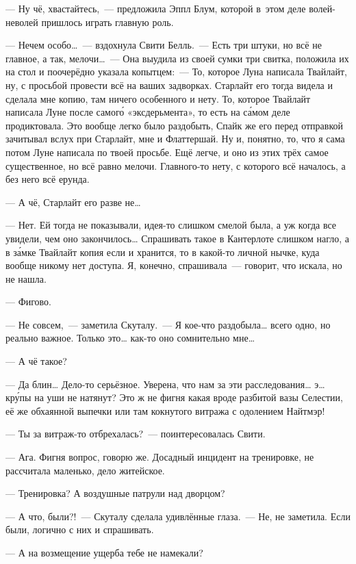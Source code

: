 \documentclass[fontsize=11pt,a5paper,titlepage=firstcover]{scrbook}
\begin{document}
--- Ну чё, хвастайтесь,~--- предложила Эппл Блум, которой в~этом деле волей-неволей пришлось играть главную роль.

--- Нечем особо{\ldots}~--- вздохнула Свити Белль.~--- Есть три штуки, но всё не главное, а так, мелочи{\ldots}~--- Она выудила из своей сумки три свитка, положила их на стол и поочерёдно указала копытцем:~--- То, которое Луна написала Твайлайт, ну, с просьбой провести всё на ваших задворках. Старлайт его тогда видела и сделала мне копию, там ничего особенного и нету. То, которое Твайлайт написала Луне после самого́ «эксдерьмента», то есть на са́мом деле продиктовала. Это вообще легко было раздобыть, Спайк же его перед отправкой зачитывал вслух при Старлайт, мне и Флаттершай. Ну и, понятно, то, что я сама потом Луне написала по твоей просьбе. Ещё легче, и оно из этих трёх самое существенное, но всё равно мелочи. Главного-то нету, с которого всё началось, а без него всё ерунда.

--- А чё, Старлайт его разве не{\ldots}

--- Нет. Ей тогда не показывали, идея-то слишком смелой была, а уж когда все увидели, чем оно закончилось{\ldots} Спрашивать такое в Кантерлоте слишком нагло, а в за́мке Твайлайт копия если и хранится, то в какой-то личной нычке, куда вообще никому нет доступа. Я, конечно, спрашивала~--- говорит, что искала, но не нашла.

--- Фигово.

--- Не совсем,~--- заметила Скуталу.~--- Я кое-что раздобыла{\ldots} всего одно, но реально важное. Только это{\ldots} как-то оно сомнительно мне{\ldots}

--- А чё такое?

--- Да блин{\ldots} Дело-то серьёзное. Уверена, что нам за эти расследования{\ldots} э{\ldots} кру́пы на уши не натянут? Это ж не фигня какая вроде разбитой вазы Селестии, её же обхаянной выпечки или там кокнутого витража с одолением Найтмэр!

--- Ты за витраж-то отбрехалась?~--- поинтересовалась Свити.

--- Ага. Фигня вопрос, говорю же. Досадный инцидент на тренировке, не рассчитала маленько, дело житейское.

--- Тренировка? А воздушные патрули над дворцом?

--- А что, были?!~--- Скуталу сделала удивлённые глаза.~--- Не, не заметила. Если были, логично с них и спрашивать.

--- А на возмещение ущерба тебе не намекали?
\end{document}

